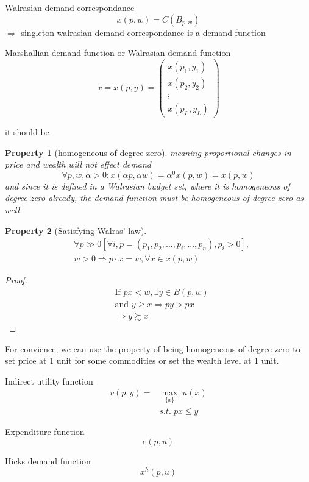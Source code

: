 \documentclass{article}
\newtheorem{property}{Property}
\begin{document}
Walrasian demand correspondance
$$x(p,w)=C(B_{p,w})$$
$\Rightarrow$ singleton walrasian demand correspondance is a demand function

Marshallian demand function or Walrasian demand function
$$x=x(p,y)=\begin{pmatrix}x(p_{1},y_{1}) \\ x(p_{2},y_{2}) \\ \vdots \\ x(p_{L},y_{L})\end{pmatrix}$$

it should be

\begin{property}[homogeneous of degree zero]
meaning proportional changes in price and wealth will not effect demand
$$\forall p,w,\alpha>0:x(\alpha p, \alpha w)=\alpha^{0}x(p,w)=x(p,w)$$
and since it is defined in a Walrasian budget set, where it is homogeneous of degree zero already, the demand function must be homogeneous of degree zero as well
\end{property}

\begin{property}[Satisfying Walras' law]
\begin{align}
&\forall p \gg 0 [\forall i ,p=(p_{1},p_{2},...,p_{i},...,p_{n}),p_{i}>0],
\\&w>0 \Rightarrow p \cdot x=w, \forall x\in x(p,w)
\end{align}
\end{property}

\begin{proof}
\begin{align}
&\text{If } px<w, \exists y \in B(p,w)
\\&\text{and } y\ge x \Rightarrow py >px
\\&\Rightarrow y \succsim x
\end{align}
\end{proof}

For convience, we can use the property of being homogeneous of degree zero to set price at 1 unit for some commodities or set the wealth level at 1 unit.

Indirect utility function
\begin{align}
v(p,y)=& \mathop{max}_{\{x\}} \;u(x)
\\&s.t.\; px \leqslant y
\end{align}

Expenditure function
$$e(p,u)$$

Hicks demand function
$$x^{h}(p,u)$$
\end{document}

